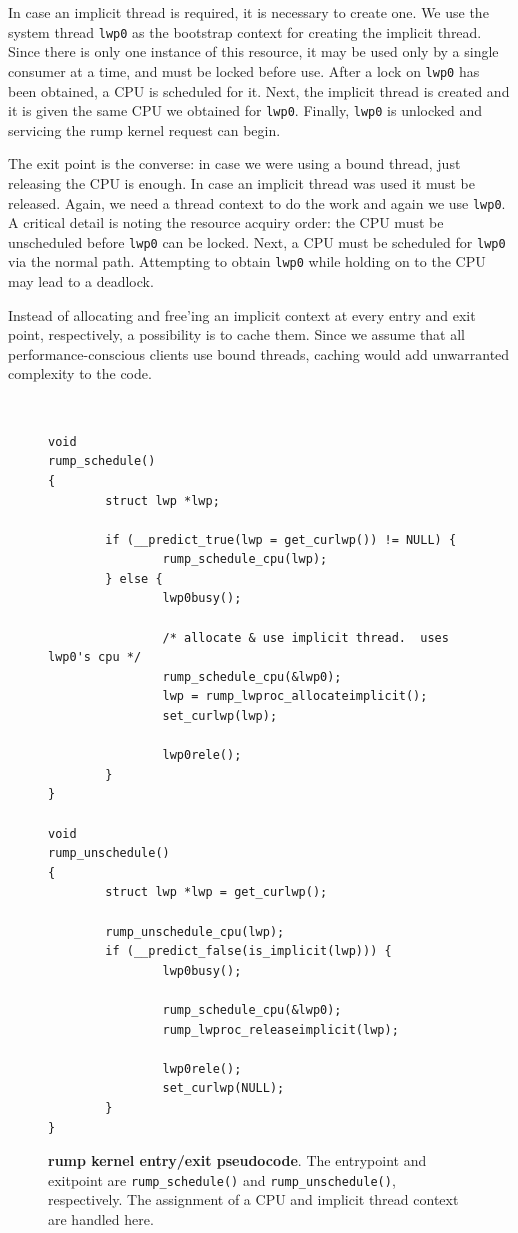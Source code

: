 In case an implicit thread is required, it is necessary to create
one.  We use the system thread \texttt{lwp0} as the bootstrap
context for creating the implicit thread.  Since there is only one
instance of this resource, it may be used only by a single consumer
at a time, and must be locked before use.  After a lock on
\texttt{lwp0} has been obtained, a CPU is scheduled for it.  Next,
the implicit thread is created and it is given the same CPU
we obtained for \texttt{lwp0}.  Finally, \texttt{lwp0} is unlocked
and servicing the rump kernel request can begin.

The exit point is the converse: in case we were using a bound
thread, just releasing the CPU is enough.  In case an implicit
thread was used it must be released.  Again, we need a thread
context to do the work and again we use \texttt{lwp0}.  A critical
detail is noting the resource acquiry order: the CPU must be
unscheduled before \texttt{lwp0} can be locked.  Next, a CPU
must be scheduled for \texttt{lwp0} via the normal path.  Attempting
to obtain \texttt{lwp0} while holding on to the CPU may lead to a
deadlock.

Instead of allocating and free'ing an implicit context at every
entry and exit point, respectively, a possibility is to cache them.
Since we assume that all performance-conscious clients use bound
threads, caching would add unwarranted complexity to the code.

\begin{figure}[t]
{\tt \scriptsize
\begin{verbatim}
void
rump_schedule()
{
        struct lwp *lwp;

        if (__predict_true(lwp = get_curlwp()) != NULL) {
                rump_schedule_cpu(lwp);
        } else {
                lwp0busy();

                /* allocate & use implicit thread.  uses lwp0's cpu */
                rump_schedule_cpu(&lwp0);
                lwp = rump_lwproc_allocateimplicit();
                set_curlwp(lwp);

                lwp0rele();
        }
}

void
rump_unschedule()
{
        struct lwp *lwp = get_curlwp();

        rump_unschedule_cpu(lwp);
        if (__predict_false(is_implicit(lwp))) {
                lwp0busy();

                rump_schedule_cpu(&lwp0);
                rump_lwproc_releaseimplicit(lwp);

                lwp0rele();
                set_curlwp(NULL);
        }
}
\end{verbatim}}
\caption[rump kernel entry/exit pseudocode]{\textbf{rump kernel entry/exit pseudocode}.
The entrypoint and exitpoint are \texttt{rump\_schedule()} and
\texttt{rump\_unschedule()}, respectively.  The assignment of a
CPU and implicit thread context are handled here.
}
\label{fig:threadsched}
\end{figure}
\clearpage

